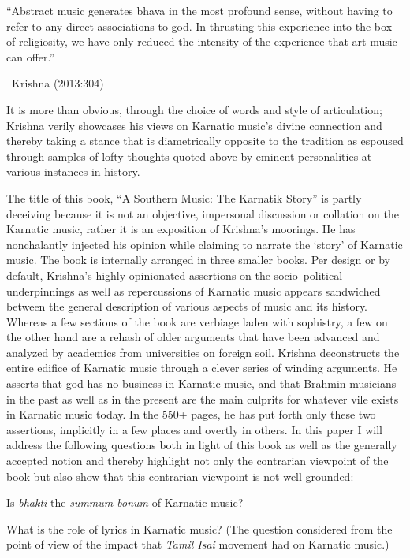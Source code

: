 \begin{myquote}
“Abstract music generates bhava in the most profound sense, without having to refer to any direct associations to god. In thrusting this experience into the box of religiosity, we have only reduced the intensity of the experience that art music can offer.” 

~\hfill Krishna (2013:304)
\end{myquote}

It is more than obvious, through the choice of words and style of articulation; Krishna verily showcases his views on Karnatic music’s divine connection and thereby taking a stance that is diametrically opposite to the tradition as espoused through samples of lofty thoughts quoted above by eminent personalities at various instances in history.

The title of this book, “A Southern Music: The Karnatik Story” is partly deceiving because it is not an objective, impersonal discussion or collation on the Karnatic music, rather it is an exposition of Krishna’s moorings. He has nonchalantly injected his opinion while claiming to narrate the ‘story’ of Karnatic music. The book is internally arranged in three smaller books. Per design or by default, Krishna’s highly opinionated assertions on the socio–political underpinnings as well as repercussions of Karnatic music appears sandwiched between the general description of various aspects of music and its history. Whereas a few sections of the book are verbiage laden with sophistry, a few on the other hand are a rehash of older arguments that have been advanced and analyzed by academics from universities on foreign soil. Krishna deconstructs the entire edifice of Karnatic music through a clever series of winding arguments. He asserts that god has no business in Karnatic music, and that Brahmin musicians in the past as well as in the present are the main culprits for whatever vile exists in Karnatic music today. In the 550+ pages, he has put forth only these two assertions, implicitly in a few places and overtly in others. In this paper I will address the following questions both in light of this book as well as the generally accepted notion and thereby highlight not only the contrarian viewpoint of the book but also show that this contrarian viewpoint is not well grounded:

\item Is \textit{bhakti} the \textit{summum bonum} of Karnatic music?

 \item What is the role of lyrics in Karnatic music? (The question considered from the point of view of the impact that \textit{Tamil Isai} movement had on Karnatic music.)

